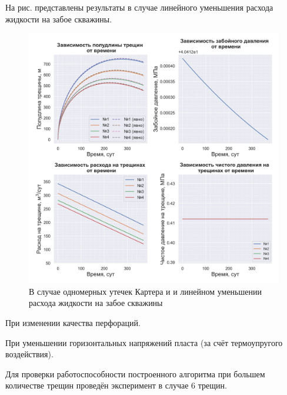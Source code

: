 На рис. представлены результаты в случае линейного уменьшения расхода жидкости на забое скважины.

\begin{figure}[H] 
\center
\includegraphics[width=\linewidth]{images/myimage5.jpg}
\caption{В случае одномерных утечек Картера и и линейном уменьшении расхода жидкости на забое скважины}
\label{fig:myimage5}
\end{figure}

При изменении качества перфораций.


При уменьшении горизонтальных напряжений пласта (за счёт термоупругого воздействия).


Для проверки работоспособности построенного алгоритма при большем количестве трещин проведён эксперимент в случае 6 трещин.



%

